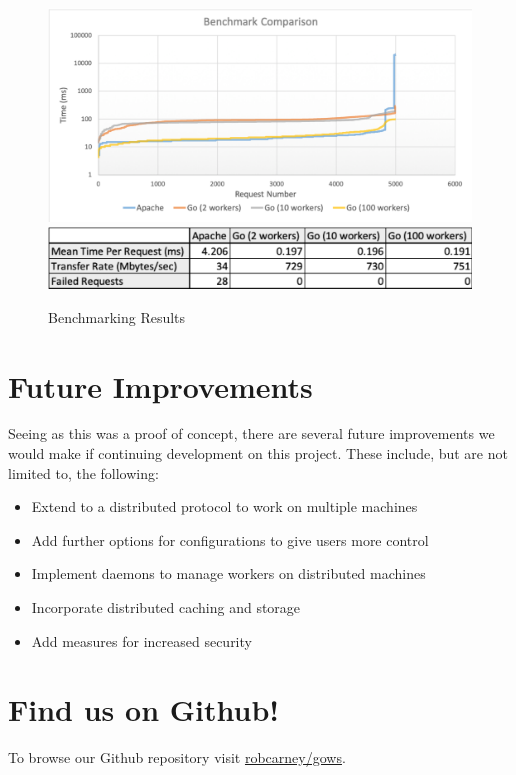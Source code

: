 \documentclass[10pt]{article}
\begin{document}
\begin{figure}[h]
\centering
        \includegraphics[width=16cm]{./images/graph.png}
        \includegraphics[width=16cm]{./images/table.png}
        \caption{Benchmarking Results}
\end{figure}
\pagebreak
\begin{multicols*}{2}
\section*{Future Improvements}
\par
Seeing as this was a proof of concept, there are several future improvements we would make if continuing development on this project. These include, but are not limited to, the following:
\begin{itemize}
\item
Extend to a distributed protocol to work on multiple machines
\item
Add further options for configurations to give users more control
\item
Implement daemons to manage workers on distributed machines
\item
Incorporate distributed caching and storage
\item
Add measures for increased security
\end{itemize}
\section*{Find us on Github!}
\par
To browse our Github repository visit \href{https://github.com/robcarney/gows}{robcarney/gows}.
\end{multicols*}
\end{document}
